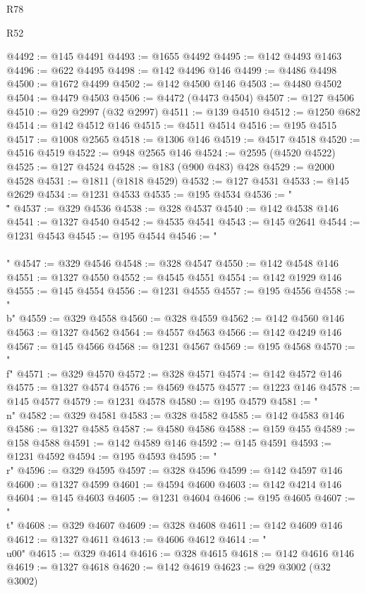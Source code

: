 \begin{lexlean}{R78}
\begin{lexlean}{R52}
\begin{coremodule}
{{{{{{{{{{{{{{{{{{{{{{{{{{{{{{{{{{{{{{{{{{{{{{{{{{{{{{{{{{{{{{{{{{{{{{{{{{{{{{{{{{{{{{{{{{{{{{{{{{{{{{{{{{{{{{{{{{{{{{{{{{{{{{{{{{{{{{{{{{{{{{{{{{{{{{{{{{{{{{{{{{{{{{{{{{{{{{{{{{{{{{{{{{{{{{{{{{{{{{@4492 := @145 @4491
@4493 := @1655 @4492
@4495 := @142 @4493 @1463
@4496 := @622 @4495
@4498 := @142 @4496 @146
@4499 := @4486 @4498
@4500 := @1672 @4499
@4502 := @142 @4500 @146
@4503 := @4480 @4502
@4504 := @4479 @4503
@4506 := @4472 (@4473 @4504)
@4507 := @127 @4506
@4510 := @29 @2997 (@32 @2997)
@4511 := @139 @4510
@4512 := @1250 @682
@4514 := @142 @4512 @146
@4515 := @4511 @4514
@4516 := @195 @4515
@4517 := @1008 @2565
@4518 := @1306 @146
@4519 := @4517 @4518
@4520 := @4516 @4519
@4522 := @948 @2565 @146
@4524 := @2595 (@4520 @4522)
@4525 := @127 @4524
@4528 := @183 (@900 @483) @428
@4529 := @2000 @4528
@4531 := @1811 (@1818 @4529)
@4532 := @127 @4531
@4533 := @145 @2629
@4534 := @1231 @4533
@4535 := @195 @4534
@4536 := "\\\""
@4537 := @329 @4536
@4538 := @328 @4537
@4540 := @142 @4538 @146
@4541 := @1327 @4540
@4542 := @4535 @4541
@4543 := @145 @2641
@4544 := @1231 @4543
@4545 := @195 @4544
@4546 := "\\\\"
@4547 := @329 @4546
@4548 := @328 @4547
@4550 := @142 @4548 @146
@4551 := @1327 @4550
@4552 := @4545 @4551
@4554 := @142 @1929 @146
@4555 := @145 @4554
@4556 := @1231 @4555
@4557 := @195 @4556
@4558 := "\\b"
@4559 := @329 @4558
@4560 := @328 @4559
@4562 := @142 @4560 @146
@4563 := @1327 @4562
@4564 := @4557 @4563
@4566 := @142 @4249 @146
@4567 := @145 @4566
@4568 := @1231 @4567
@4569 := @195 @4568
@4570 := "\\f"
@4571 := @329 @4570
@4572 := @328 @4571
@4574 := @142 @4572 @146
@4575 := @1327 @4574
@4576 := @4569 @4575
@4577 := @1223 @146
@4578 := @145 @4577
@4579 := @1231 @4578
@4580 := @195 @4579
@4581 := "\\n"
@4582 := @329 @4581
@4583 := @328 @4582
@4585 := @142 @4583 @146
@4586 := @1327 @4585
@4587 := @4580 @4586
@4588 := @159 @455
@4589 := @158 @4588
@4591 := @142 @4589 @146
@4592 := @145 @4591
@4593 := @1231 @4592
@4594 := @195 @4593
@4595 := "\\r"
@4596 := @329 @4595
@4597 := @328 @4596
@4599 := @142 @4597 @146
@4600 := @1327 @4599
@4601 := @4594 @4600
@4603 := @142 @4214 @146
@4604 := @145 @4603
@4605 := @1231 @4604
@4606 := @195 @4605
@4607 := "\\t"
@4608 := @329 @4607
@4609 := @328 @4608
@4611 := @142 @4609 @146
@4612 := @1327 @4611
@4613 := @4606 @4612
@4614 := "\\u00"
@4615 := @329 @4614
@4616 := @328 @4615
@4618 := @142 @4616 @146
@4619 := @1327 @4618
@4620 := @142 @4619
@4623 := @29 @3002 (@32 @3002)
}}}}}}}}}}}}}}}}}}}}}}}}}}}}}}}}}}}}}}}}}}}}}}}}}}}}}}}}}}}}}}}}}}}}}}}}}}}}}}}}}}}}}}}}}}}}}}}}}}}}}}}}}}}}}}}}}}}}}}}}}}}}}}}}}}}}}}}}}}}}}}}}}}}}}}}}}}}}}}}}}}}}}}}}}}}}}}}}}}}}}}}}}}}}}}}}}}}}}}
\end{coremodule}
\end{lexlean}
\end{lexlean}
